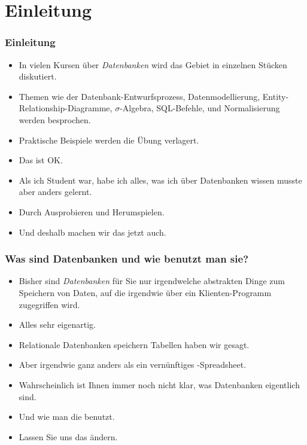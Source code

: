 \documentclass[aspectratio=169,mathserif,notheorems]{beamer}%
\subtitle{7.~Fabrik-Datenbank:~Benutzer und Datenbank}%
\begin{document}
%
%
\startPresentation%
%
\section{Einleitung}%
%
\begin{frame}%
\frametitle{Einleitung}%
\begin{itemize}%
\item In vielen Kursen über \emph{Datenbanken} wird das Gebiet in einzelnen Stücken diskutiert.%
\item<2-> Themen wie der Datenbank-Entwurfsprozess, Datenmodellierung, Entity-Relationship-Diagramme, $\sigma$\nobreakdashes-Algebra, SQL\nobreakdashes-Befehle, und Normalisierung werden besprochen.%
\item<3-> Praktische Beispiele werden die Übung verlagert.%
\item<4-> Das ist OK.%
\item<5-> Als ich Student war, habe ich alles, was ich über Datenbanken wissen musste aber anders gelernt.%
\item<6-> Durch Ausprobieren und Herumspielen.%
\item<7-> Und deshalb machen wir das jetzt auch.%
\end{itemize}%
\end{frame}%
%
\begin{frame}%
\frametitle{Was sind Datenbanken und wie benutzt man sie?}%
\begin{itemize}%
\item Bisher sind \emph{Datenbanken} für Sie nur irgendwelche abstrakten Dinge zum Speichern von Daten, auf die irgendwie über ein Klienten-Programm zugegriffen wird.%
\item<2-> Alles sehr eigenartig.%
\item<3-> Relationale Datenbanken speichern Tabellen haben wir gesagt.%
\item<4-> Aber irgendwie ganz anders als ein vernünftiges \microsoftExcel-Spreadsheet.%
\item<5-> Wahrscheinlich ist Ihnen immer noch nicht klar, was Datenbanken eigentlich sind.%
\item<6-> Und wie man die benutzt.%
\item<7-> Lassen Sie uns das ändern.%
\end{itemize}%
\end{frame}%
%
\end{document}
